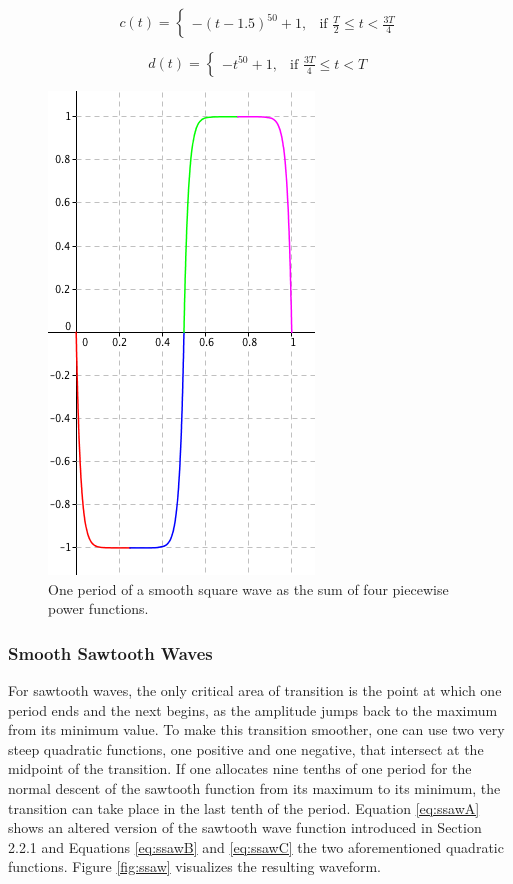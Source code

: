 \documentclass[12pt,twoside]{report}
\begin{document}
\begin{equation}
  c(t) =
  \begin{cases}
    -(t - 1.5)^{50} + 1,& \text{if } \frac{T}{2} \leq t < \frac{3T}{4}
  \end{cases}
  \label{eq:ssquareC}
\end{equation}

\begin{equation}
  d(t) =
  \begin{cases}
    -t^{50} + 1,& \text{if } \frac{3T}{4} \leq t < T
  \end{cases}
  \label{eq:ssquareD}
\end{equation}

\begin{figure}[t!]
  \includegraphics[scale=0.5]{img/ssquare}
  \caption{One period of a smooth square wave as the sum of four piecewise power functions.}
  \label{fig:ssquare}
\end{figure}

\subsubsection{Smooth Sawtooth Waves}

For sawtooth waves, the only critical area of transition is the point at which one period ends and the next begins, as the amplitude jumps back to the maximum from its minimum value. To make this transition smoother, one can use two very steep quadratic functions, one positive and one negative, that intersect at the midpoint of the transition. If one allocates nine tenths of one period for the normal descent of the sawtooth function from its maximum to its minimum, the transition can take place in the last tenth of the period. Equation \ref{eq:ssawA} shows an altered version of the sawtooth wave function introduced in Section 2.2.1 and Equations \ref{eq:ssawB} and \ref{eq:ssawC} the two aforementioned quadratic functions. Figure \ref{fig:ssaw} visualizes the resulting waveform.
\end{document}
